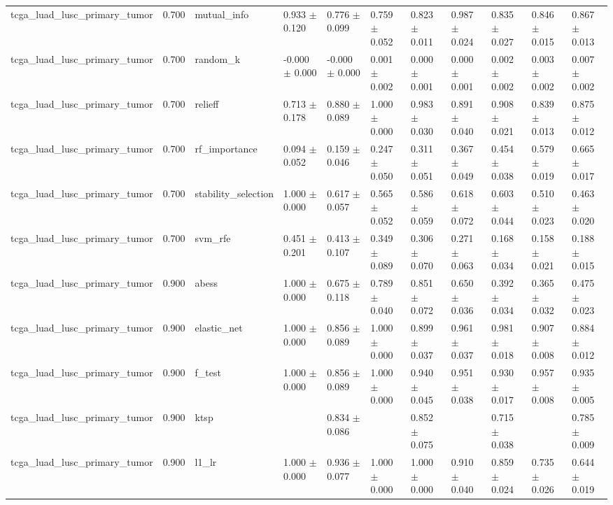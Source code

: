 \begin{table}[t]
\begin{tabular}{lllllllllll}
    tcga\_luad\_lusc\_primary\_tumor & 0.700 & mutual\_info & 0.933 $\pm$ 0.120 & 0.776 $\pm$ 0.099 & 0.759 $\pm$ 0.052 & 0.823 $\pm$ 0.011 & 0.987 $\pm$ 0.024 & 0.835 $\pm$ 0.027 & 0.846 $\pm$ 0.015 & 0.867 $\pm$ 0.013 \\
    tcga\_luad\_lusc\_primary\_tumor & 0.700 & random\_k & -0.000 $\pm$ 0.000 & -0.000 $\pm$ 0.000 & 0.001 $\pm$ 0.002 & 0.000 $\pm$ 0.001 & 0.000 $\pm$ 0.001 & 0.002 $\pm$ 0.002 & 0.003 $\pm$ 0.002 & 0.007 $\pm$ 0.002 \\
    tcga\_luad\_lusc\_primary\_tumor & 0.700 & relieff & 0.713 $\pm$ 0.178 & 0.880 $\pm$ 0.089 & 1.000 $\pm$ 0.000 & 0.983 $\pm$ 0.030 & 0.891 $\pm$ 0.040 & 0.908 $\pm$ 0.021 & 0.839 $\pm$ 0.013 & 0.875 $\pm$ 0.012 \\
    tcga\_luad\_lusc\_primary\_tumor & 0.700 & rf\_importance & 0.094 $\pm$ 0.052 & 0.159 $\pm$ 0.046 & 0.247 $\pm$ 0.050 & 0.311 $\pm$ 0.051 & 0.367 $\pm$ 0.049 & 0.454 $\pm$ 0.038 & 0.579 $\pm$ 0.019 & 0.665 $\pm$ 0.017 \\
    tcga\_luad\_lusc\_primary\_tumor & 0.700 & stability\_selection & 1.000 $\pm$ 0.000 & 0.617 $\pm$ 0.057 & 0.565 $\pm$ 0.052 & 0.586 $\pm$ 0.059 & 0.618 $\pm$ 0.072 & 0.603 $\pm$ 0.044 & 0.510 $\pm$ 0.023 & 0.463 $\pm$ 0.020 \\
    tcga\_luad\_lusc\_primary\_tumor & 0.700 & svm\_rfe & 0.451 $\pm$ 0.201 & 0.413 $\pm$ 0.107 & 0.349 $\pm$ 0.089 & 0.306 $\pm$ 0.070 & 0.271 $\pm$ 0.063 & 0.168 $\pm$ 0.034 & 0.158 $\pm$ 0.021 & 0.188 $\pm$ 0.015 \\
    tcga\_luad\_lusc\_primary\_tumor & 0.900 & abess & 1.000 $\pm$ 0.000 & 0.675 $\pm$ 0.118 & 0.789 $\pm$ 0.040 & 0.851 $\pm$ 0.072 & 0.650 $\pm$ 0.036 & 0.392 $\pm$ 0.034 & 0.365 $\pm$ 0.032 & 0.475 $\pm$ 0.023 \\
    tcga\_luad\_lusc\_primary\_tumor & 0.900 & elastic\_net & 1.000 $\pm$ 0.000 & 0.856 $\pm$ 0.089 & 1.000 $\pm$ 0.000 & 0.899 $\pm$ 0.037 & 0.961 $\pm$ 0.037 & 0.981 $\pm$ 0.018 & 0.907 $\pm$ 0.008 & 0.884 $\pm$ 0.012 \\
    tcga\_luad\_lusc\_primary\_tumor & 0.900 & f\_test & 1.000 $\pm$ 0.000 & 0.856 $\pm$ 0.089 & 1.000 $\pm$ 0.000 & 0.940 $\pm$ 0.045 & 0.951 $\pm$ 0.038 & 0.930 $\pm$ 0.017 & 0.957 $\pm$ 0.008 & 0.935 $\pm$ 0.005 \\
    tcga\_luad\_lusc\_primary\_tumor & 0.900 & ktsp &  & 0.834 $\pm$ 0.086 &  & 0.852 $\pm$ 0.075 &  & 0.715 $\pm$ 0.038 &  & 0.785 $\pm$ 0.009 \\
    tcga\_luad\_lusc\_primary\_tumor & 0.900 & l1\_lr & 1.000 $\pm$ 0.000 & 0.936 $\pm$ 0.077 & 1.000 $\pm$ 0.000 & 1.000 $\pm$ 0.000 & 0.910 $\pm$ 0.040 & 0.859 $\pm$ 0.024 & 0.735 $\pm$ 0.026 & 0.644 $\pm$ 0.019 \\

\end{tabular}
\end{table}
